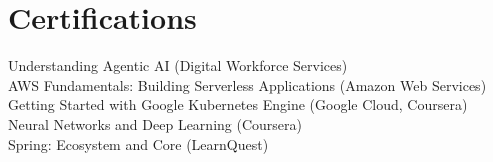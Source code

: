 \documentclass[letterpaper,11pt]{article}
\begin{document}
\section{Certifications}
 \begin{itemize}[leftmargin=0.15in, label={}]
    {\small\item{
     Understanding Agentic AI (Digital Workforce Services) \\[4pt]
     AWS Fundamentals: Building Serverless Applications (Amazon Web Services) \\[4pt]
     Getting Started with Google Kubernetes Engine (Google Cloud, Coursera) \\[4pt]
     Neural Networks and Deep Learning (Coursera) \\[4pt]
     Spring: Ecosystem and Core (LearnQuest)\par
    }}
 \end{itemize}
\end{document}
